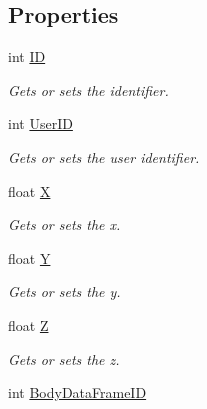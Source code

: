 \subsection*{Properties}
\begin{DoxyCompactItemize}
\item 
int \mbox{\hyperlink{class_bar_none_1_1_shared_1_1_domain_model_1_1_joint_a55857ba49bcc6bf20e662964a40c7c6b}{ID}}
\begin{DoxyCompactList}\small\item\em Gets or sets the identifier. \end{DoxyCompactList}\item 
int \mbox{\hyperlink{class_bar_none_1_1_shared_1_1_domain_model_1_1_joint_a5be11c60d35ef447b199a7f48e9df463}{User\+ID}}
\begin{DoxyCompactList}\small\item\em Gets or sets the user identifier. \end{DoxyCompactList}\item 
float \mbox{\hyperlink{class_bar_none_1_1_shared_1_1_domain_model_1_1_joint_a23c223296ea7cce12685478d19d043c9}{X}}
\begin{DoxyCompactList}\small\item\em Gets or sets the x. \end{DoxyCompactList}\item 
float \mbox{\hyperlink{class_bar_none_1_1_shared_1_1_domain_model_1_1_joint_aa10674ce17f200adcfe139bf7593bc3c}{Y}}
\begin{DoxyCompactList}\small\item\em Gets or sets the y. \end{DoxyCompactList}\item 
float \mbox{\hyperlink{class_bar_none_1_1_shared_1_1_domain_model_1_1_joint_adf6462a06f9aea08acc07998ef9cc233}{Z}}
\begin{DoxyCompactList}\small\item\em Gets or sets the z. \end{DoxyCompactList}\item 
int \mbox{\hyperlink{class_bar_none_1_1_shared_1_1_domain_model_1_1_joint_aef0ff11f3c530f071c8e50cbe408ea59}{Body\+Data\+Frame\+ID}}

\end{DoxyCompactItemize}

